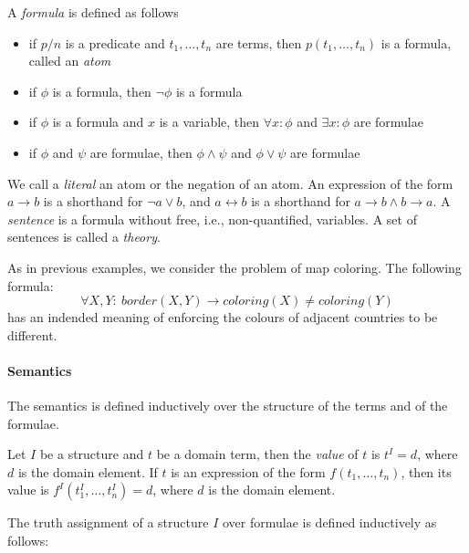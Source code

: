 A \textit{formula} is defined as follows

\begin{itemize}
  \item if $p/n$ is a predicate and $t_1,\dots,t_n$ are terms, then $p(t_1,\dots,t_n)$ is a formula, called an \textit{atom}  
  \item if $\phi$ is a formula, then $\lnot \phi$ is a formula
  \item if $\phi$ is a formula and $x$ is a variable, then $\forall x: \phi$ and $\exists x: \phi$ are formulae 
  \item if $\phi$ and $\psi$ are formulae, then $\phi \wedge \psi$ and $\phi \vee \psi$ are formulae
\end{itemize}

We call a \textit{literal} an atom or the negation of an atom. An expression of the form $a \rightarrow b$ is a shorthand for $\lnot a \vee b$, and $a \leftrightarrow b$ is a shorthand for $a \rightarrow b \wedge b \rightarrow a$. A \textit{sentence} is a formula without free, i.e., non-quantified, variables. A set of sentences  is called a \textit{theory}.

\begin{example}[Formula]\label{example:formula}
  As in previous examples, we consider the problem of map coloring. The following formula:
  \begin{equation*}
    \forall X,Y{:}~\textit{border}(X,Y) \rightarrow \textit{coloring}(X) \neq \textit{coloring}(Y)
  \end{equation*}
has an indended meaning of enforcing the colours of adjacent countries to be different.
\end{example}


\paragraph{Semantics}
The semantics is defined inductively over the structure of the terms and of the formulae.

Let $I$ be a structure and $t$ be a domain term, then the \textit{value} of $t$ is $t^I = d$, where $d$ is the domain element. If $t$ is an expression of the form $f(t_1,\dots,t_n)$, then its value is $f^I(t_1^I,\dots,t_n^I)=d$, where $d$ is the domain element.

The truth assignment of a structure $I$ over formulae is defined inductively as follows:

